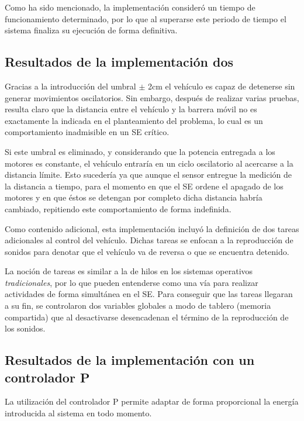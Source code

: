 \documentclass[journal]{IEEEtran}
\begin{document}
Como ha sido mencionado, la implementación consideró un tiempo de funcionamiento determinado, por lo que al superarse este periodo de tiempo el sistema finaliza su ejecución de forma definitiva. 

\subsection{Resultados de la implementación dos} 
\label{sub:resultados-implementacion-dos}

Gracias a la introducción del umbral $\pm$ 2cm el vehículo es capaz de detenerse sin generar movimientos oscilatorios.
Sin embargo, después de realizar varias pruebas, resulta claro que la distancia entre el vehículo y la barrera móvil no es exactamente la indicada en el planteamiento del problema, lo cual es un comportamiento inadmisible en un SE crítico.

Si este umbral es eliminado, y considerando que la potencia entregada a los motores es constante, el vehículo entraría en un ciclo oscilatorio al acercarse a la distancia límite. 
Esto sucedería ya que aunque el sensor entregue la medición de la distancia a tiempo, para el momento en que el SE ordene el apagado de los motores y en que éstos se detengan por completo dicha distancia habría cambiado, repitiendo este comportamiento de forma indefinida.

Como contenido adicional, esta implementación incluyó la definición de dos tareas adicionales al control del vehículo.
Dichas tareas se enfocan a la reproducción de sonidos para denotar que el vehículo va de reversa o que se encuentra detenido.

La noción de tareas es similar a la de hilos en los sistemas operativos \emph{tradicionales}, por lo que pueden entenderse como una vía para realizar actividades de forma simultánea en el SE.
Para conseguir que las tareas llegaran a su fin, se controlaron dos variables globales a modo de tablero (memoria compartida) que al desactivarse desencadenan el término de la reproducción de los sonidos.

\subsection{Resultados de la implementación con un controlador P} 
\label{sub:implementacion_con_un_controlador_p}

La utilización del controlador P permite adaptar de forma proporcional la energía introducida al sistema en todo momento.
\end{document}
